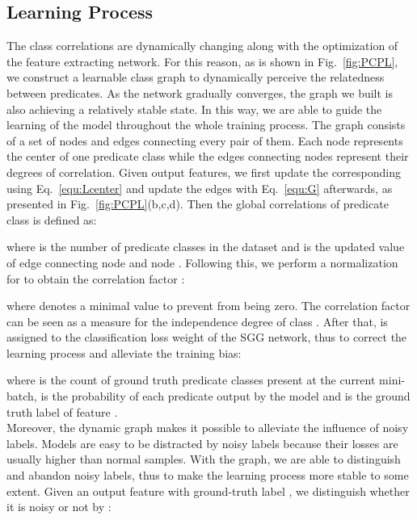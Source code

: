 \documentclass[sigconf]{acmart}
\begin{document}
\subsection{Learning Process}
The class correlations are dynamically changing along with the optimization of the feature extracting network. For this reason, as is shown in Fig.~\ref{fig:PCPL}, we construct a learnable class graph to dynamically perceive the relatedness between predicates. As the network gradually converges, the graph we built is also achieving a relatively stable state. In this way, we are able to guide the learning of the model throughout the whole training process. The graph consists of a set of nodes and edges connecting every pair of them. Each node represents the center of one predicate class while the edges connecting nodes represent their degrees of correlation. Given output features, we first update the corresponding  using Eq.~\ref{equ:Lcenter} and update the edges with Eq.~\ref{equ:G} afterwards, as presented in Fig.~\ref{fig:PCPL}(b,c,d). Then the global correlations  of predicate class  is defined as:

where  is the number of predicate classes in the dataset and  is the updated value of edge connecting node  and node .  Following this, we perform a normalization for  to obtain the correlation factor :

where  denotes a minimal value to prevent  from being zero. The correlation factor  can be seen as a measure for the independence degree of class . After that,  is assigned to the classification loss weight of the SGG network, thus to correct the learning process and alleviate the training bias:


where  is the count of ground truth predicate classes present at the current mini-batch,  is the probability of each predicate output by the model and  is the ground truth label of feature .
\\\indent Moreover, the dynamic graph makes it possible to alleviate the influence of noisy labels. Models are easy to be distracted by noisy labels because their losses are usually higher than normal samples. With the graph, we are able to distinguish and abandon noisy labels, thus to make the learning process more stable to some extent. Given an output feature  with ground-truth label , we distinguish whether it is noisy or not by :
\end{document}
